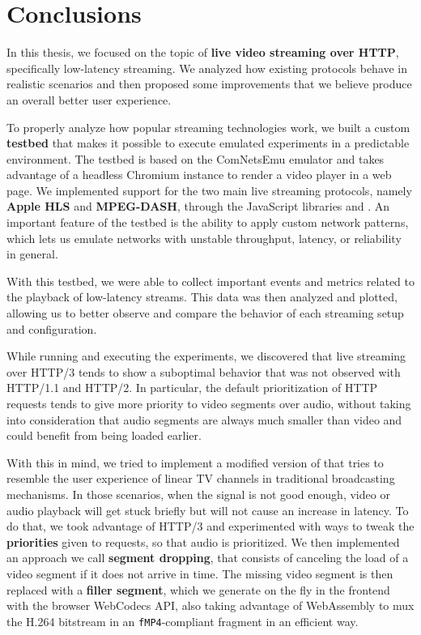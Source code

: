 \chapter{Conclusions}
\label{cha:conclusions}

In this thesis, we focused on the topic of \textbf{live video streaming over HTTP}, specifically low-latency streaming. We analyzed how existing protocols behave in realistic scenarios and then proposed some improvements that we believe produce an overall better user experience.

To properly analyze how popular streaming technologies work, we built a custom \textbf{testbed} that makes it possible to execute emulated experiments in a predictable environment. The testbed is based on the ComNetsEmu emulator and takes advantage of a headless Chromium instance to render a video player in a web page. We implemented support for the two main live streaming protocols, namely \textbf{Apple HLS} and \textbf{MPEG-DASH}, through the JavaScript libraries \hlsjs{} and \dashjs{}. An important feature of the testbed is the ability to apply custom network patterns, which lets us emulate networks with unstable throughput, latency, or reliability in general.

With this testbed, we were able to collect important events and metrics related to the playback of low-latency streams. This data was then analyzed and plotted, allowing us to better observe and compare the behavior of each streaming setup and configuration.

While running and executing the experiments, we discovered that live streaming over HTTP/3 tends to show a suboptimal behavior that was not observed with HTTP/1.1 and HTTP/2. In particular, the default prioritization of HTTP requests tends to give more priority to video segments over audio, without taking into consideration that audio segments are always much smaller than video and could benefit from being loaded earlier.

With this in mind, we tried to implement a modified version of \hlsjs{} that tries to resemble the user experience of linear TV channels in traditional broadcasting mechanisms. In those scenarios, when the signal is not good enough, video or audio playback will get stuck briefly but will not cause an increase in latency. To do that, we took advantage of HTTP/3 and experimented with ways to tweak the \textbf{priorities} given to requests, so that audio is prioritized. We then implemented an approach we call \textbf{segment dropping}, that consists of canceling the load of a video segment if it does not arrive in time. The missing video segment is then replaced with a \textbf{filler segment}, which we generate on the fly in the frontend with the browser WebCodecs API, also taking advantage of WebAssembly to mux the H.264 bitstream in an \texttt{fMP4}-compliant fragment in an efficient way.

